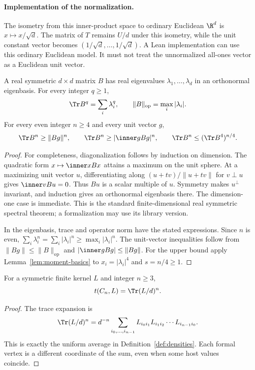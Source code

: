 \paragraph{Implementation of the normalization.}
The isometry from this inner-product space to ordinary Euclidean $\R^d$ is
$x\mapsto x/\sqrt d$.  The matrix of $T$ remains $U/d$ under this isometry, while the unit
constant vector becomes $(1/\sqrt d,\ldots,1/\sqrt d)$.  A Lean implementation can use this
ordinary Euclidean model.  It must not treat the unnormalized all-ones vector as a Euclidean
unit vector.

\begin{lemma}
\label{lem:finite-spectral}
\proved A real symmetric $d\times d$ matrix $B$ has real eigenvalues
$\lambda_1,\ldots,\lambda_d$ in an orthonormal eigenbasis.  For every integer $q\ge1$,
\[
 \Tr B^q=\sum_i\lambda_i^q,\qquad
 \|B\|_{\mathrm{op}}=\max_i|\lambda_i|.
\]
For every even integer $n\ge4$ and every unit vector $g$,
\[
 \Tr B^n\ge\|Bg\|^n,\qquad
 \Tr B^n\ge|\inner g{Bg}|^n,
 \qquad
 \Tr B^n\le(\Tr B^4)^{n/4}.
\]
\end{lemma}
\begin{proof}
For completeness, diagonalization follows by induction on dimension.  The quadratic form
$x\mapsto\inner x{Bx}$ attains a maximum on the unit sphere.  At a maximizing unit vector
$u$, differentiating along $(u+tv)/\|u+tv\|$ for $v\perp u$ gives
$\inner v{Bu}=0$.  Thus $Bu$ is a scalar multiple of $u$.  Symmetry makes $u^\perp$
invariant, and induction gives an orthonormal eigenbasis there.  The dimension-one case
is immediate.  This is the standard finite-dimensional real symmetric spectral theorem;
a formalization may use its library version.

In the eigenbasis, trace and operator norm have the stated expressions.  Since $n$ is even,
$\sum_i\lambda_i^n=\sum_i|\lambda_i|^n\ge\max_i|\lambda_i|^n$.
The unit-vector inequalities follow from $\|Bg\|\le\|B\|_{\mathrm{op}}$ and
$|\inner g{Bg}|\le\|Bg\|$.  For the upper bound apply
Lemma~\ref{lem:moment-basics} to $x_i=|\lambda_i|^4$ and $s=n/4\ge1$.
\end{proof}

\begin{lemma}
\label{lem:cycle-trace}
\proved For a symmetric finite kernel $L$ and integer $n\ge3$,
\[
 t(C_n,L)=\Tr(L/d)^n.
\]
\end{lemma}
\begin{proof}
The trace expansion is
\[
 \Tr(L/d)^n
 =d^{-n}\sum_{i_0,\ldots,i_{n-1}}
 L_{i_0i_1}L_{i_1i_2}\cdots L_{i_{n-1}i_0}.
\]
This is exactly the uniform average in Definition~\ref{def:densities}.  Each formal vertex
is a different coordinate of the sum, even when some host values coincide.
\end{proof}

